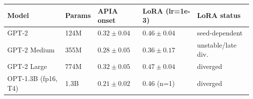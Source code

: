 \begin{tabular}{lllll}
\toprule
Model & Params & APIA onset & LoRA (lr=1e-3) & LoRA status \\
\midrule
GPT-2 & 124M & $0.32{\pm}0.04$ & $0.46{\pm}0.04$ & seed-dependent \\
GPT-2 Medium & 355M & $0.28{\pm}0.05$ & $0.36{\pm}0.17$ & unstable/late div. \\
GPT-2 Large & 774M & $0.32{\pm}0.05$ & $0.47{\pm}0.04$ & diverged \\
OPT-1.3B (fp16, T4) & 1.3B & $0.21{\pm}0.02$ & 0.46 (n=1) & diverged \\
\bottomrule
\end{tabular}
